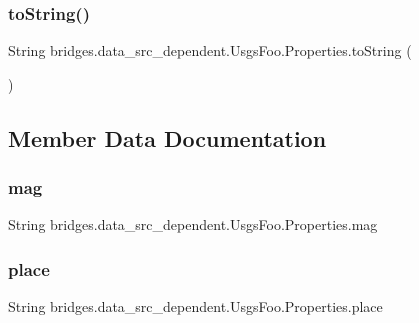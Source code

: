 \subsubsection{\texorpdfstring{to\+String()}{toString()}}
{\footnotesize\ttfamily String bridges.\+data\+\_\+src\+\_\+dependent.\+Usgs\+Foo.\+Properties.\+to\+String (\begin{DoxyParamCaption}{ }\end{DoxyParamCaption})}



\subsection{Member Data Documentation}
\hypertarget{classbridges_1_1data__src__dependent_1_1_usgs_foo_1_1_properties_a114163b5773ae63dc7554d0fb365f540}{}\label{classbridges_1_1data__src__dependent_1_1_usgs_foo_1_1_properties_a114163b5773ae63dc7554d0fb365f540} 
\subsubsection{\texorpdfstring{mag}{mag}}
{\footnotesize\ttfamily String bridges.\+data\+\_\+src\+\_\+dependent.\+Usgs\+Foo.\+Properties.\+mag}

\hypertarget{classbridges_1_1data__src__dependent_1_1_usgs_foo_1_1_properties_a78104fd6df6eec29b1598669127df9ed}{}\label{classbridges_1_1data__src__dependent_1_1_usgs_foo_1_1_properties_a78104fd6df6eec29b1598669127df9ed} 
\subsubsection{\texorpdfstring{place}{place}}
{\footnotesize\ttfamily String bridges.\+data\+\_\+src\+\_\+dependent.\+Usgs\+Foo.\+Properties.\+place}

\hypertarget{classbridges_1_1data__src__dependent_1_1_usgs_foo_1_1_properties_a6e42210e723e44d15bcea954ccd6b579}{}\label{classbridges_1_1data__src__dependent_1_1_usgs_foo_1_1_properties_a6e42210e723e44d15bcea954ccd6b579} 
